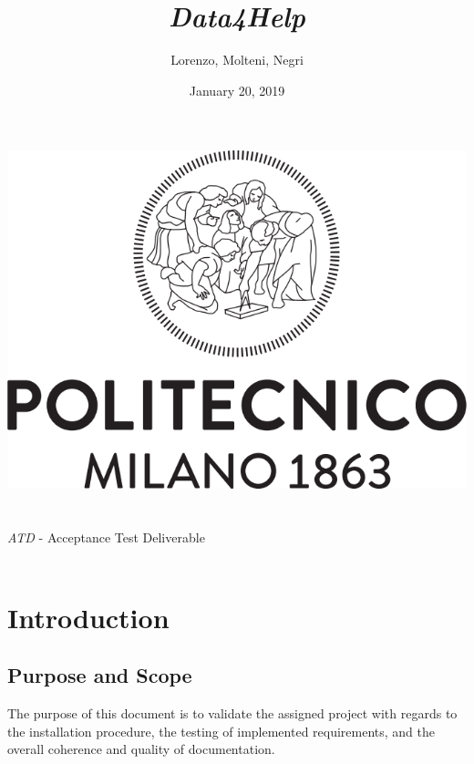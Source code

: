 \documentclass[titlepage]{article}
\title{{\Huge {\it {\it Data4Help}}}}
\author{Lorenzo, Molteni, Negri}
\date{January 20, 2019}
\begin{document}
\makeatletter
    \begin{titlepage}
        \begin{center}
            \includegraphics[width=\linewidth]{logo.png}\\[20ex]
            {\huge  \@title }\\[2ex] 
            {\LARGE  \@author}\\[3ex] 
            {\LARGE {\it ATD} - Acceptance Test Deliverable}\\[3ex]
            {\large \@date}\\[5ex]
        \end{center}
    \end{titlepage}
\makeatother
\thispagestyle{empty}
\newpage

\thispagestyle{empty}
\newpage


	
\pagebreak
\tableofcontents{}
\pagebreak


\section{Introduction}

\subsection{Purpose and Scope}
The purpose of this document is to validate the assigned project with regards to the installation procedure, the testing of implemented requirements, and the overall coherence and quality of documentation.
\end{document}
